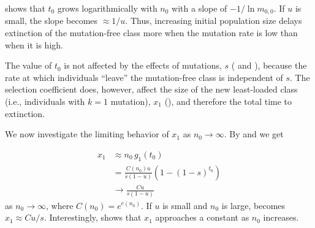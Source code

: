 \documentclass[9pt,lineno]{elife}
\begin{document}
 shows that $t_0$ grows logarithmically with $n_0$ 
with a slope of $-1/\ln m_{0,0}$.  If $u$ is small, the slope becomes $\approx 1/u$.  Thus, increasing initial population size delays extinction of the mutation-free class more when the mutation rate is low than when it is high.

The value of $t_0$ is not affected by the effects of mutations, $s$ ( and ), because the rate at which individuals ``leave'' the mutation-free class is independent of $s$.  The selection coefficient does, however, affect the size of the new least-loaded class (i.e., individuals with $k=1$ mutation), $x_1$ (), and therefore the total time to extinction. 

We now investigate the limiting behavior of $x_1$ as $n_0\to\infty$. By  and  we get 

\begin{align}
%
x_{1} &\approx n_0 \, g_{1}(t_0) \nonumber \\[3pt]
      &= \frac{C(n_0) u}{s(1-u)} \left(1-(1-s)^{t_0}\right) \nonumber \\[3pt]
      &\to \frac{C u}{s(1-u)}
%
\label{eq:x1}
\end{align}
%
as $n_0\to\infty$, where $C(n_0) = e^{c(n_0)}$. If $u$ is small and $n_0$ is large, 
 becomes $x_1 \approx C u / s$.
Interestingly,  shows that $x_1$ approaches a constant as $n_0$ increases.
\end{document}
